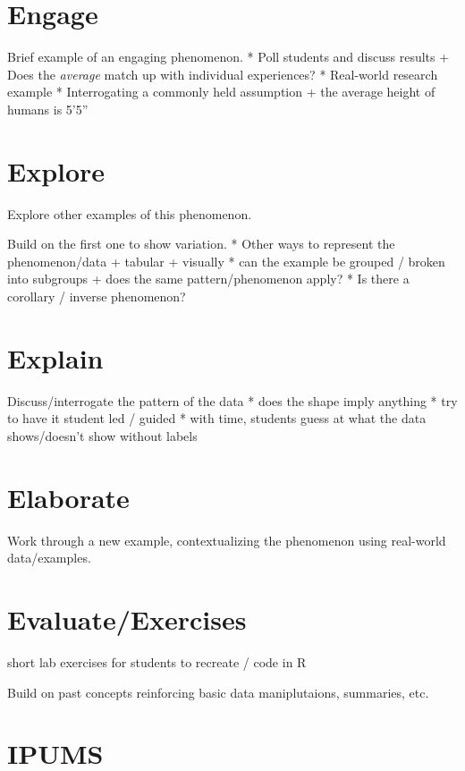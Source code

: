 \documentclass[
]{book}
\begin{document}
\hypertarget{engage}{%
\chapter{Engage}\label{engage}}

Brief example of an engaging phenomenon.
* Poll students and discuss results
+ Does the \emph{average} match up with individual experiences?
* Real-world research example
* Interrogating a commonly held assumption
+ the average height of humans is 5'5''

\hypertarget{explore}{%
\chapter{Explore}\label{explore}}

Explore other examples of this phenomenon.

Build on the first one to show variation.
* Other ways to represent the phenomenon/data
+ tabular
+ visually
* can the example be grouped / broken into subgroups
+ does the same pattern/phenomenon apply?
* Is there a corollary / inverse phenomenon?

\hypertarget{explain}{%
\chapter{Explain}\label{explain}}

Discuss/interrogate the pattern of the data
* does the shape imply anything
* try to have it student led / guided
* with time, students guess at what the data shows/doesn't show without labels

\hypertarget{elaborate}{%
\chapter{Elaborate}\label{elaborate}}

Work through a new example, contextualizing the phenomenon using real-world data/examples.

\hypertarget{evaluateexercises}{%
\chapter{Evaluate/Exercises}\label{evaluateexercises}}

short lab exercises for students to recreate / code in R

Build on past concepts reinforcing basic data maniplutaions, summaries, etc.

\hypertarget{unit2}{%
\chapter{IPUMS}\label{unit2}}
\end{document}
